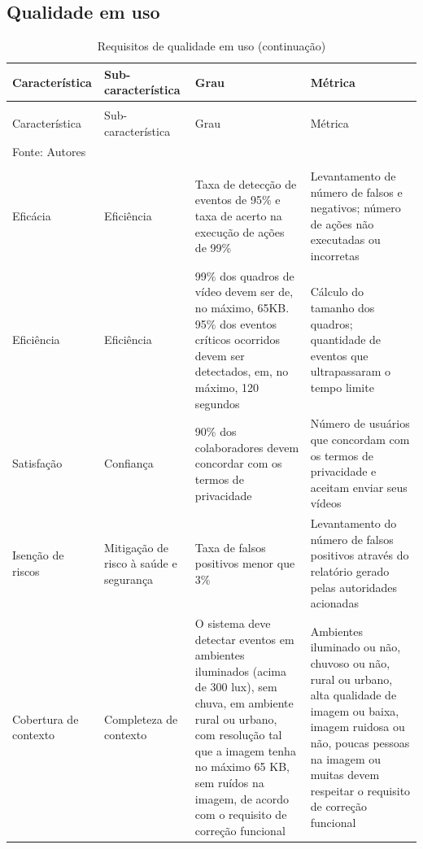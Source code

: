 \documentclass[]{politex}
\begin{document}
\subsection{Qualidade em uso}
\begin{center}
\begin{longtable}{m{3cm} | m{4cm} | m{4cm} | m{4cm}} 
\caption{\label{tab:qualidade_em_uso}Requisitos de qualidade em uso}\\
\hline\hline
Característica & Sub-característica & Grau & Métrica \\
\hline
\endfirsthead
\caption[]{Requisitos de qualidade em uso (continuação)} \\
\hline
Característica & Sub-característica & Grau & Métrica \\
\hline
\endhead
\hline\hline
\multicolumn{4}{l}{Fonte: Autores} \\
\endlastfoot
\hline
\multicolumn{4}{r}{\footnotesize{}continua na próxima página} \\
\endfoot
Eficácia & Eficiência & Taxa de detecção de eventos de 95\% e taxa de acerto na execução de ações de 99\% & Levantamento de número de falsos e negativos; número de ações não executadas ou incorretas \\ 
\hline
Eficiência & Eficiência & 99\% dos quadros de vídeo devem ser de, no máximo, 65KB. 95\% dos eventos críticos ocorridos devem ser detectados, em, no máximo, 120 segundos & Cálculo do tamanho dos quadros; quantidade de eventos que ultrapassaram o tempo limite \\
\hline
Satisfação & Confiança & 90\% dos colaboradores devem concordar com os termos de privacidade & Número de usuários que concordam com os termos de privacidade e aceitam enviar seus vídeos\\
\hline
Isenção de riscos & Mitigação de risco à saúde e segurança & Taxa de falsos positivos menor que 3\% & Levantamento do número de falsos positivos através do relatório gerado pelas autoridades acionadas\\
\hline
Cobertura de contexto & Completeza de contexto & O sistema deve detectar eventos em ambientes iluminados (acima de 300 lux), sem chuva, em ambiente rural ou urbano, com resolução tal que a imagem tenha no máximo 65 KB, sem ruídos na imagem, de acordo com o requisito de correção funcional & Ambientes iluminado ou não, chuvoso ou não, rural ou urbano, alta qualidade de imagem ou baixa, imagem ruidosa ou não, poucas pessoas na imagem ou muitas devem respeitar o requisito de correção funcional \\
\end{longtable}
\end{center}
\end{document}
